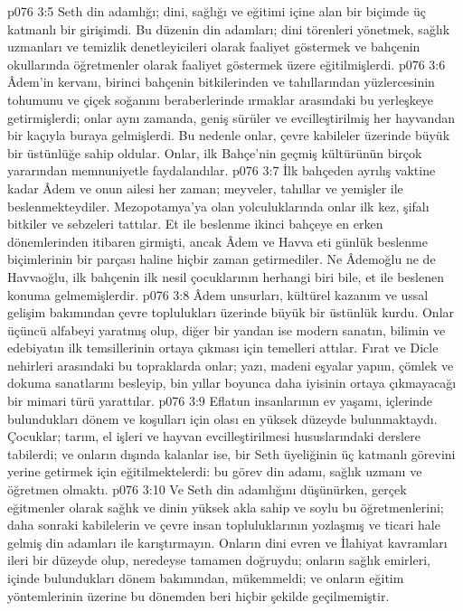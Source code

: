 \vs p076 3:5 Seth din adamlığı; dini, sağlığı ve eğitimi içine alan bir biçimde üç katmanlı bir girişimdi. Bu düzenin din adamları; dini törenleri yönetmek, sağlık uzmanları ve temizlik denetleyicileri olarak faaliyet göstermek ve bahçenin okullarında öğretmenler olarak faaliyet göstermek üzere eğitilmişlerdi.
\vs p076 3:6 Âdem’in kervanı, birinci bahçenin bitkilerinden ve tahıllarından yüzlercesinin tohumunu ve çiçek soğanını beraberlerinde ırmaklar arasındaki bu yerleşkeye getirmişlerdi; onlar aynı zamanda, geniş sürüler ve evcilleştirilmiş her hayvandan bir kaçıyla buraya gelmişlerdi. Bu nedenle onlar, çevre kabileler üzerinde büyük bir üstünlüğe sahip oldular. Onlar, ilk Bahçe’nin geçmiş kültürünün birçok yararından memnuniyetle faydalandılar.
\vs p076 3:7 İlk bahçeden ayrılış vaktine kadar Âdem ve onun ailesi her zaman; meyveler, tahıllar ve yemişler ile beslenmekteydiler. Mezopotamya’ya olan yolculuklarında onlar ilk kez, şifalı bitkiler ve sebzeleri tattılar. Et ile beslenme ikinci bahçeye en erken dönemlerinden itibaren girmişti, ancak Âdem ve Havva eti günlük beslenme biçimlerinin bir parçası haline hiçbir zaman getirmediler. Ne Âdemoğlu ne de Havvaoğlu, ilk bahçenin ilk nesil çocuklarının herhangi biri bile, et ile beslenen konuma gelmemişlerdir.
\vs p076 3:8 Âdem unsurları, kültürel kazanım ve ussal gelişim bakımından çevre toplulukları üzerinde büyük bir üstünlük kurdu. Onlar üçüncü alfabeyi yaratmış olup, diğer bir yandan ise modern sanatın, bilimin ve edebiyatın ilk temsillerinin ortaya çıkması için temelleri attılar. Fırat ve Dicle nehirleri arasındaki bu topraklarda onlar; yazı, madeni eşyalar yapım, çömlek ve dokuma sanatlarını besleyip, bin yıllar boyunca daha iyisinin ortaya çıkmayacağı bir mimari türü yarattılar.
\vs p076 3:9 Eflatun insanlarının ev yaşamı, içlerinde bulundukları dönem ve koşulları için olası en yüksek düzeyde bulunmaktaydı. Çocuklar; tarım, el işleri ve hayvan evcilleştirilmesi hususlarındaki derslere tabilerdi; ve onların dışında kalanlar ise, bir Seth üyeliğinin üç katmanlı görevini yerine getirmek için eğitilmektelerdi: bu görev din adamı, sağlık uzmanı ve öğretmen olmaktı.
\vs p076 3:10 Ve Seth din adamlığını düşünürken, gerçek eğitmenler olarak sağlık ve dinin yüksek akla sahip ve soylu bu öğretmenlerini; daha sonraki kabilelerin ve çevre insan topluluklarının yozlaşmış ve ticari hale gelmiş din adamları ile karıştırmayın. Onların dini evren ve İlahiyat kavramları ileri bir düzeyde olup, neredeyse tamamen doğruydu; onların sağlık emirleri, içinde bulundukları dönem bakımından, mükemmeldi; ve onların eğitim yöntemlerinin üzerine bu dönemden beri hiçbir şekilde geçilmemiştir.
